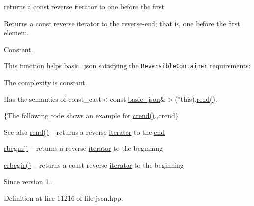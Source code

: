 returns a const reverse iterator to one before the first 

Returns a const reverse iterator to the reverse-\/end; that is, one before the first element.

  Constant.

This function helps {\ttfamily \hyperlink{classnlohmann_1_1basic__json}{basic\+\_\+json}} satisfying the \href{http://en.cppreference.com/w/cpp/concept/ReversibleContainer}{\tt Reversible\+Container} requirements\+:
\begin{DoxyItemize}
\item The complexity is constant.
\item Has the semantics of {\ttfamily const\+\_\+cast$<$const \hyperlink{classnlohmann_1_1basic__json}{basic\+\_\+json}\&$>$($\ast$this).\hyperlink{classnlohmann_1_1basic__json_ac77aed0925d447744676725ab0b6d535}{rend()}}.
\end{DoxyItemize}

\{The following code shows an example for {\ttfamily \hyperlink{classnlohmann_1_1basic__json_a5795b029dbf28e0cb2c7a439ec5d0a88}{crend()}}.,crend\}

\begin{DoxySeeAlso}{See also}
\hyperlink{classnlohmann_1_1basic__json_ac77aed0925d447744676725ab0b6d535}{rend()} -- returns a reverse \hyperlink{classnlohmann_1_1basic__json_a099316232c76c034030a38faa6e34dca}{iterator} to the \hyperlink{classnlohmann_1_1basic__json_a13e032a02a7fd8a93fdddc2fcbc4763c}{end} 

\hyperlink{classnlohmann_1_1basic__json_a1ef93e2006dbe52667294f5ef38b0b10}{rbegin()} -- returns a reverse \hyperlink{classnlohmann_1_1basic__json_a099316232c76c034030a38faa6e34dca}{iterator} to the beginning 

\hyperlink{classnlohmann_1_1basic__json_a1e0769d22d54573f294da0e5c6abc9de}{crbegin()} -- returns a const reverse \hyperlink{classnlohmann_1_1basic__json_a099316232c76c034030a38faa6e34dca}{iterator} to the beginning
\end{DoxySeeAlso}
\begin{DoxySince}{Since}
version 1.. 
\end{DoxySince}


Definition at line 11216 of file json.\+hpp.

